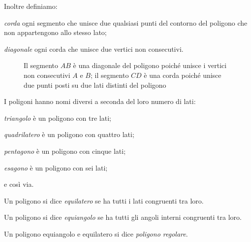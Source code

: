 Inoltre definiamo:
\begin{itemize*}
\item \emph{corda} ogni segmento che unisce due qualsiasi punti del contorno del poligono che non appartengono allo stesso lato;
\item \emph{diagonale} ogni corda che unisce due vertici non consecutivi.
\end{itemize*}

\begin{figure}[htb]
\centering
\caption{Il segmento $AB$ è una diagonale del poligono poiché unisce i vertici non consecutivi $A$ e $B$; il segmento $CD$ è una corda poiché unisce due punti posti su due lati distinti del poligono}
\end{figure}

I poligoni hanno nomi diversi a seconda del loro numero di lati:
\begin{itemize*}
\item \emph{triangolo} è un poligono con tre lati;
\item \emph{quadrilatero} è un poligono con quattro lati;
\item \emph{pentagono} è un poligono con cinque lati;
\item \emph{esagono} è un poligono con sei lati;
\item e così via.
\end{itemize*}

\begin{definizione}
Un poligono si dice \emph{equilatero} se ha tutti i lati congruenti tra loro.
\end{definizione}

\begin{definizione}
Un poligono si dice \emph{equiangolo} se ha tutti gli angoli interni congruenti tra loro.
\end{definizione}

\begin{definizione}
Un poligono equiangolo e equilatero si dice \emph{poligono regolare}.
\end{definizione}



